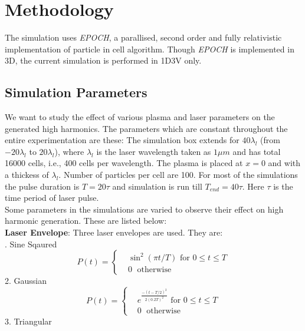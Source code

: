 \documentclass[12pt]{article}
\newenvironment{changemargin}[2]{
\begin{list}{}{
\setlength{\topsep}{0pt}
\setlength{\leftmargin}{#1}
\setlength{\rightmargin}{#2}
\setlength{\listparindent}{\parindent}
\setlength{\itemindent}{\parindent}
\setlength{\parsep}{\parskip}
}
\item[]}{\end{list}}
\begin{document}
\begin{changemargin}{-2cm}{-2cm}
    \section{Methodology}
    The simulation uses \textit{EPOCH}, a parallised, second order and fully relativistic implementation of particle in cell algorithm.\cite{EPOCH} Though \textit{EPOCH} is implemented in 3D, the current simulation is performed in 1D3V only.
    \subsection{Simulation Parameters}
    We want to study the effect of various plasma and laser parameters on the generated high harmonics. The parameters which are constant throughout the entire experimentation are these:
    The simulation box extends for $40 \lambda _l$ (from $-20 \lambda _l$ to $20 \lambda _l$), where $\lambda_l$ is the laser wavelength taken as $1\mu m$ and has total 16000 cells, i.e., 400 cells per wavelength. The plasma is placed at $x=0$ and with a thickess of $\lambda_l$. Number of particles per cell are 100.
    For most of the simulations the pulse duration is $T = 20 \tau$ and simulation is run till $T_{end} = 40 \tau$. Here $\tau$ is the time period of laser pulse.\\
    Some parameters in the simulations are varied to observe their effect on high harmonic generation. These are listed below:\\
    \textbf{Laser Envelope}:
    Three laser envelopes are used. They are:\\
    . Sine Sqaured
    \begin{equation}\label{sin-sq-env}
        P(t)=
        \begin{cases}
             & \sin^2(\pi t/T) \text{ for } 0 \leq t \le T \\
             & 0         \;      \text{ otherwise }
        \end{cases}
    \end{equation}
    2. Gaussian
    \begin{equation}\label{gaussian-env}
        P(t)=
        \begin{cases}
             & e^{\frac{-(t-T/2)^2}{2(0.2T)^2}} \text{ for } 0 \leq t \le T \\
             & 0         \;      \text{ otherwise }
        \end{cases}
    \end{equation}
    3. Triangular
    \begin{equation}\label{triangle-env}

\end{equation}
\end{changemargin}
\end{document}
